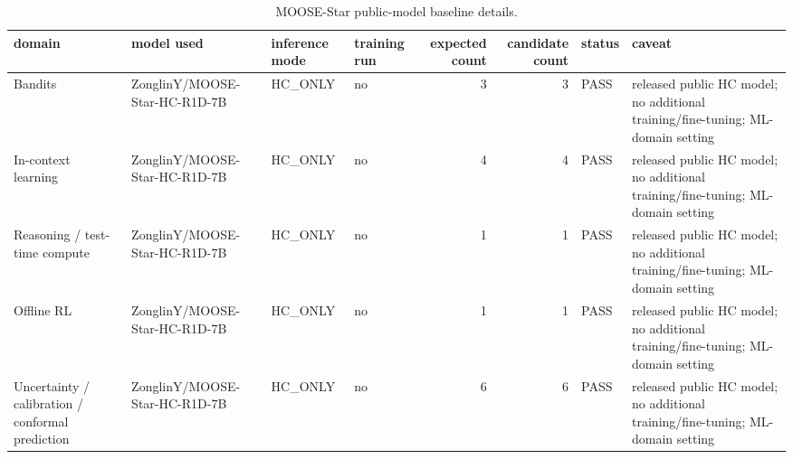 \begin{table}[htbp]
\centering
\caption{MOOSE-Star public-model baseline details.}
\label{tab:moose\_details}
\begin{tabular}{llllrrll}
\toprule
domain & model used & inference mode & training run & expected count & candidate count & status & caveat \\
\midrule
Bandits & ZonglinY/MOOSE-Star-HC-R1D-7B & HC\_ONLY & no & 3 & 3 & PASS & released public HC model; no additional training/fine-tuning; ML-domain setting \\
In-context learning & ZonglinY/MOOSE-Star-HC-R1D-7B & HC\_ONLY & no & 4 & 4 & PASS & released public HC model; no additional training/fine-tuning; ML-domain setting \\
Reasoning / test-time compute & ZonglinY/MOOSE-Star-HC-R1D-7B & HC\_ONLY & no & 1 & 1 & PASS & released public HC model; no additional training/fine-tuning; ML-domain setting \\
Offline RL & ZonglinY/MOOSE-Star-HC-R1D-7B & HC\_ONLY & no & 1 & 1 & PASS & released public HC model; no additional training/fine-tuning; ML-domain setting \\
Uncertainty / calibration / conformal prediction & ZonglinY/MOOSE-Star-HC-R1D-7B & HC\_ONLY & no & 6 & 6 & PASS & released public HC model; no additional training/fine-tuning; ML-domain setting \\
\bottomrule
\end{tabular}
\end{table}

